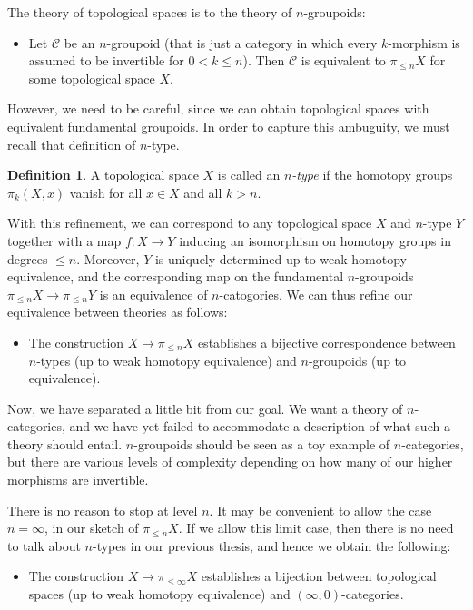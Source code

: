 \documentclass[a4paper,11pt]{article}
\newcommand{\ccal}{\mathcal{C}}
\theoremstyle{plain}
\theoremstyle{definition}
\newtheorem{defi}[thm]{Definition}
\theoremstyle{remark}
\begin{document}
The theory of topological spaces is  to the theory of $n$-groupoids:
\begin{itemize}
    \item Let $\ccal$ be an $n$-groupoid (that is just a category in which every $k$-morphism is assumed to be invertible for $0 < k \leq n$). Then $\ccal$ is equivalent to $\pi_{\leq n} X$ for some topological space $X$. 
\end{itemize}

However, we need to be careful, since we can obtain topological spaces with equivalent fundamental groupoids. In order to capture this ambuguity, we must recall that definition of $n$-type. 

\begin{defi}
A topological space $X$ is called an \textit{$n$-type} if the homotopy groups $\pi_k(X,x)$ vanish for all $x \in X$ and all $k>n$. 
\end{defi}

With this refinement, we can correspond to any topological space $X$ and $n$-type $Y$ together with a map $f \colon X \to Y$ inducing an isomorphism on homotopy groups in degrees $\leq n$. Moreover, $Y$ is uniquely determined up to weak homotopy equivalence, and the corresponding map on the fundamental $n$-groupoids $\pi_{\leq n} X \to \pi_{\leq n} Y$ is an equivalence of $n$-catogories. We can thus refine our equivalence between theories as follows:
\begin{itemize}
    \item The construction $X \mapsto \pi_{\leq n} X$ establishes a bijective correspondence between $n$-types (up to weak homotopy equivalence) and $n$-groupoids (up to equivalence).
\end{itemize}


Now, we have separated a little bit from our goal. We want a theory of $n$-categories, and we have yet failed to accommodate a description of what such a theory should entail. $n$-groupoids should be seen as a toy example of $n$-categories, but there are various levels of complexity depending on how many of our higher morphisms are invertible. 



There is no reason to stop at level $n$. It may be convenient to allow the case $n = \infty$, in our sketch of $\pi_{\leq n} X$. If we allow this limit case, then there is no need to talk about $n$-types in our previous thesis, and hence we obtain the following: 

\begin{itemize}
    \item The construction $X \mapsto \pi_{\leq \infty} X$ establishes a bijection between topological spaces (up to weak homotopy equivalence) and $(\infty, 0)$-categories. 
\end{itemize}
\end{document}
